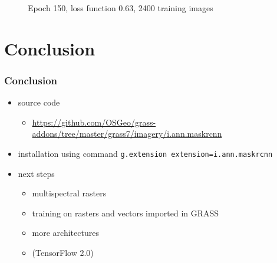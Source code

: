 \documentclass{beamer}
\begin{document}
\begin{frame}
\begin{figure}[ht]
{	\caption*{Epoch 150, loss function 0.63, 2400 training images}}
\end{figure}

\end{frame}


\section{Conclusion}

\begin{frame}[fragile]

\frametitle{Conclusion}

\begin{itemize}
	\item source code
	\begin{itemize}
		\item \url{https://github.com/OSGeo/grass-addons/tree/master/grass7/imagery/i.ann.maskrcnn}
	\end{itemize}
	\item installation using command \verb|g.extension extension=i.ann.maskrcnn|
	\item next steps
	\begin{itemize}
		\item multispectral rasters
		\item training on rasters and vectors imported in GRASS
		\item more architectures
		\item (TensorFlow 2.0)
	\end{itemize}
\end{itemize}

\end{frame}
\end{document}
